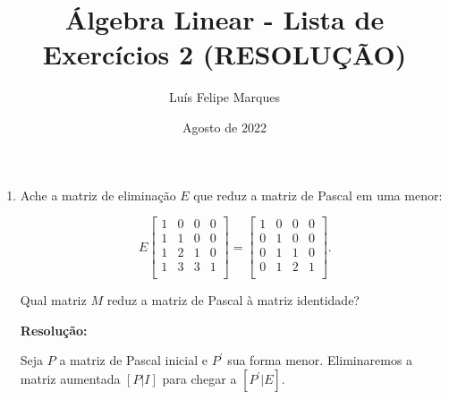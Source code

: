 \documentclass[leqno]{article}
\title{Álgebra Linear - Lista de Exercícios 2 (RESOLUÇÃO)}
\author{Luís Felipe Marques}
\date{Agosto de 2022}
\begin{document}
 
\maketitle

\begin{enumerate}
    \item Ache a matriz de eliminação $E$ que reduz a matriz de Pascal em uma menor:
    
    $$E\begin{bmatrix}
    1 & 0 & 0 & 0\\
    1 & 1 & 0 & 0\\
    1 & 2 & 1 & 0\\
    1 & 3 & 3 & 1\\
    \end{bmatrix}=\begin{bmatrix}
    1 & 0 & 0 & 0\\
    0 & 1 & 0 & 0\\
    0 & 1 & 1 & 0\\
    0 & 1 & 2 & 1\\
    \end{bmatrix}\text{.}$$
    
    Qual matriz $M$ reduz a matriz de Pascal à matriz identidade?
    
    \textbf{Resolução:}

    Seja $P$ a matriz de Pascal inicial e $P^\prime$ sua forma menor. Eliminaremos a matriz aumentada $[P|I]$ para chegar a $[P^\prime|E]$.
    

\end{enumerate}
\end{document}
